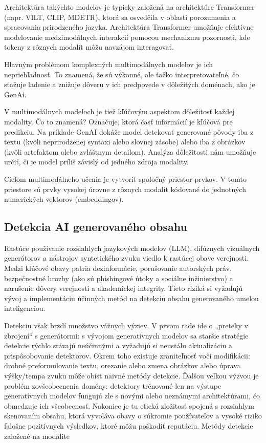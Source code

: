 \documentclass[]{tukediphc}
\begin{document}
Architektúra takýchto modelov je typicky založená na architektúre Transformer (napr. VILT, CLIP, MDETR), ktorá sa osvedčila v oblasti porozumenia a spracovania prirodzeného jazyka. Architektúra Transformer umožňuje efektívne modelovanie medzimodálnych interakcií pomocou mechanizmu pozornosti, kde tokeny z rôznych modalít môžu navzájom interagovať.\cite{arxiv:clip}

Hlavným problémom komplexných multimodálnych modelov je ich nepriehľadnosť. To znamená, že sú výkonné, ale ťažko interpretovateľné, čo sťažuje ladenie a znižuje dôveru v ich predpovede v dôležitých doménach, ako je GenAi.

V multimodálnych modeloch je tiež kľúčovým aspektom dôležitosť každej modality. Čo to znamená? Označuje, ktorá časť informácií je kľúčová pre predikciu. Na príklade GenAI dokáže model detekovať generované pôvody iba z textu (kvôli neprirodzenej syntaxi alebo slovnej zásobe) alebo iba z obrázkov (kvôli artefaktom alebo zvláštnym detailom). Analýza dôležitosti nám umožňuje určiť, či je model príliš závislý od jedného zdroja modality.

Cieľom multimodálneho učenia je vytvoriť spoločný priestor prvkov. V tomto priestore sú prvky vysokej úrovne z rôznych modalít kódované do jednotných numerických vektorov (embeddingov).\cite{arxiv:clip}

\subsection{Detekcia AI generovaného obsahu}
Rastúce používanie rozsiahlych jazykových modelov (LLM), difúznych vizuálnych generátorov a nástrojov syntetického zvuku viedlo k rastúcej obave verejnosti. Medzi kľúčové obavy patria dezinformácie, porušovanie autorských práv, bezpečnostné hrozby (ako sú phishingové útoky a sociálne inžinierstvo) a narušenie dôvery verejnosti a akademickej integrity. Tieto riziká si vyžadujú vývoj a implementáciu účinných metód na detekciu obsahu generovaného umelou inteligenciou. 

Detekciu však brzdí množstvo vážnych výziev. V prvom rade ide o „preteky v zbrojení“ s generátormi: s vývojom generatívnych modelov sa staršie stratégie detekcie rýchlo stávajú neúčinnými a vyžadujú si neustálu aktualizáciu a prispôsobovanie detektorov. Okrem toho existuje zraniteľnosť voči modifikácii: drobné preformulovanie textu, orezanie alebo zmena obrázkov alebo úprava výšky/tempa zvuku môže obísť naivné metódy detekcie. Ďalšou veľkou výzvou je problém zovšeobecnenia domény: detektory trénované len na výstupe generatívnych modelov fungujú zle s novými alebo neznámymi architektúrami, čo obmedzuje ich všeobecnosť.\cite{arxiv:2504.02898} Nakoniec je tu etická zložitosť spojená s rozsiahlym skenovaním obsahu, ktorá vyvoláva obavy o súkromie používateľov a vysoké riziko falošne pozitívnych výsledkov, ktoré môžu poškodiť reputáciu. Metódy detekcie založené na modalite 
\end{document}
